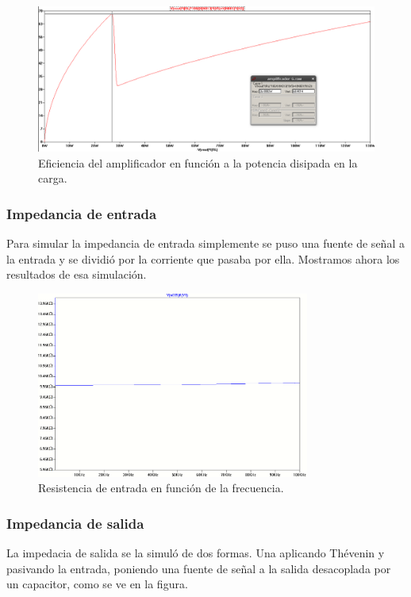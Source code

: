 \begin{figure}[H]
\centering
\includegraphics[width=1\textwidth]{img/eficiencia.png}
\caption{Eficiencia del amplificador en función a la potencia disipada en la carga.}
\label{simul_efi}
\end{figure}

\subsubsection{Impedancia de entrada}

Para simular la impedancia de entrada simplemente se puso una fuente de señal a la entrada y se dividió por la corriente que pasaba por ella. Mostramos ahora los resultados de esa simulación.

\begin{figure}[H]
\centering
\includegraphics[width=0.8\textwidth]{img/Rin.png}
\caption{Resistencia de entrada en función de la frecuencia.}
\label{Rin_sim}
\end{figure}

\subsubsection{Impedancia de salida}

La impedacia de salida se la simuló de dos formas. Una aplicando Thévenin y pasivando la entrada, poniendo una fuente de señal a la salida desacoplada por un capacitor, como se ve en la figura.

